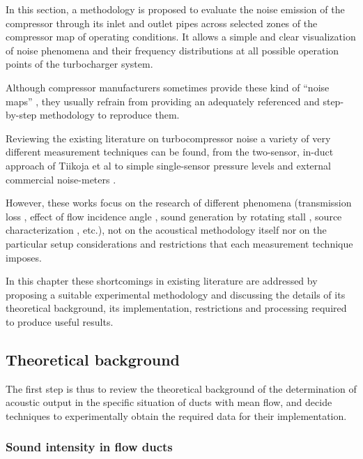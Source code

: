 In this section, a methodology is proposed to evaluate the noise emission of the compressor through its inlet and outlet pipes across selected zones of the compressor map of operating conditions. It allows a simple and clear visualization of noise phenomena and their frequency distributions at all possible operation points of the turbocharger system.

Although compressor manufacturers sometimes provide these kind of ``noise maps'' \cite{gaude2008experimental}, they usually refrain from providing an adequately referenced and step-by-step methodology to reproduce them.

Reviewing the existing literature on turbocompressor noise a variety of very different measurement techniques can be found, from the two-sensor, in-duct approach of Tiikoja et al \cite{tiikoja2011inves} to simple single-sensor pressure levels and external commercial noise-meters \cite{figurella2014noise}.

However, these works focus on the research of different phenomena (transmission loss \cite{tiikoja2011inves}, effect of flow incidence angle \cite{figurella2014noise}, sound generation by rotating stall \cite{mongeau1993sound}, source characterization \cite{mongeau1995method}, etc.), not on the acoustical methodology itself nor on the particular setup considerations and restrictions that each measurement technique imposes.

In this chapter these shortcomings in existing literature are addressed by proposing a suitable experimental methodology and discussing the details of its theoretical background, its implementation, restrictions and processing required to produce useful results.

\subsection{Theoretical background}
\label{sec:theory}

The first step is thus to review the theoretical background of the determination of acoustic output in the specific situation of ducts with mean flow, and decide techniques to experimentally obtain the required data for their implementation.

\subsubsection{Sound intensity in flow ducts}
\label{sub:sound_intensity_in_flow_ducts}

